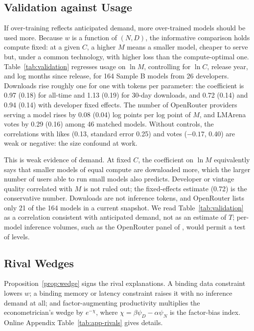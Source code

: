 \subsection{Validation against Usage}\label{sec:wedge-validation}

If over-training reflects anticipated demand, more over-trained models should be used more. Because $w$ is a function of
$(N,D)$, the informative comparison holds compute fixed: at a given $C$, a higher $M$ means a smaller model, cheaper to
serve but, under a common technology, with higher loss than the compute-optimal one. Table~\ref{tab:validation}
regresses usage on $\ln M$, controlling for $\ln C$, release year, and log months since release, for 164 Sample B models
from 26 developers. Downloads rise roughly one for one with tokens per parameter: the coefficient is 0.97 (0.18) for
all-time and 1.13 (0.19) for 30-day downloads, and 0.72 (0.14) and 0.94 (0.14) with developer fixed effects. The number
of OpenRouter providers serving a model rises by 0.08 (0.04) log points per log point of $M$, and LMArena votes by 0.29
(0.16) among 46 matched models. Without controls, the correlations with likes (0.13, standard error 0.25) and votes
($-0.17$, 0.40) are weak or negative: the size confound at work.



This is weak evidence of demand. At fixed $C$, the coefficient on $\ln M$ equivalently says that smaller models of equal
compute are downloaded more, which the larger number of users able to run small models also predicts. Developer or
vintage quality correlated with $M$ is not ruled out; the fixed-effects estimate (0.72) is the conservative number.
Downloads are not inference tokens, and OpenRouter lists only 21 of the 164 models in a current snapshot. We read
Table~\ref{tab:validation} as a correlation consistent with anticipated demand, not as an estimate of $T$; per-model
inference volumes, such as the OpenRouter panel of \citet{demirer2025emerging}, would permit a test of levels.

\subsection{Rival Wedges}\label{sec:wedge-rivals}

Proposition~\ref{prop:wedge} signs the rival explanations. A binding data constraint lowers $w$; a binding memory or
latency constraint raises it with no inference demand at all; and factor-augmenting productivity multiplies the
econometrician's wedge by $e^{-\chi}$, where $\chi=\beta\psi_D-\alpha\psi_N$ is the factor-bias index. Online Appendix Table~\ref{tab:app-rivals}
gives details.

